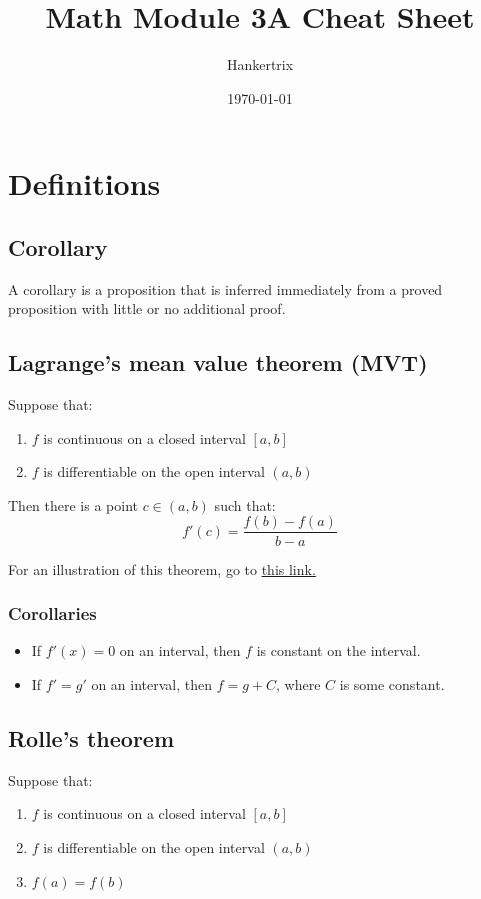 \documentclass[11pt]{article}
\author{Hankertrix}
\date{\today}
\title{Math Module 3A Cheat Sheet}
\begin{document}
\maketitle
\setcounter{tocdepth}{2}
\tableofcontents

\newpage

\section{Definitions}
\label{sec:org0ee7176}

\subsection{Corollary}
\label{sec:org3fdd1f9}
A corollary is a proposition that is inferred immediately from a proved proposition with little or no additional proof.

\subsection{Lagrange's mean value theorem (MVT)}
\label{sec:org9039de0}
Suppose that:
\begin{enumerate}
\item \(f\) is continuous on a closed interval \([a, b]\)
\item \(f\) is differentiable on the open interval \((a, b)\)
\end{enumerate}

Then there is a point \(c \in (a, b)\) such that:
\[f'(c) = \frac{f(b) - f(a)}{b - a}\]

For an illustration of this theorem, go to \href{https://www.desmos.com/calculator/humyjrcbm4}{this link.}

\subsubsection{Corollaries}
\label{sec:orged0e5f8}
\begin{itemize}
\item If \(f'(x) = 0\) on an interval, then \(f\) is constant on the interval.
\item If \(f' = g'\) on an interval, then \(f = g + C\), where \(C\) is some constant.
\end{itemize}

\subsection{Rolle's theorem}
\label{sec:orgef10361}
Suppose that:
\begin{enumerate}
\item \(f\) is continuous on a closed interval \([a, b]\)
\item \(f\) is differentiable on the open interval \((a, b)\)
\item \(f(a) = f(b)\)
\end{enumerate}
\end{document}

